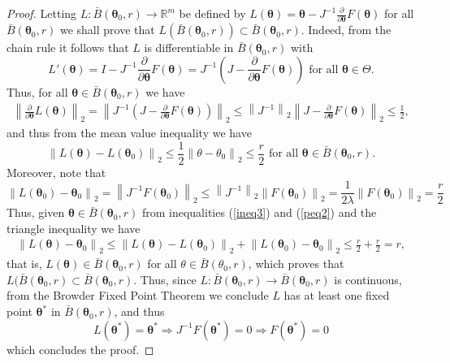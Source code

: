 \documentclass[10pt,a4paper,onecolumn]{article} %
\newcommand{\bs}{\boldsymbol}
\begin{document}
\begin{appendix}
\begin{proof}
Letting $L:\bar{B}(\bs{\theta}_0,r)\to \mathbb{R}^m$ be defined by
$L(\bs{\theta})=\bs{\theta}-J^{-1} \frac{\partial}{\partial \bs{\theta}} F(\bs{\theta})$ for all $\bar{B}(\bs{\theta}_0,r)$
we shall prove that $L(\bar{B}(\bs{\theta}_0,r))\subset \bar{B}(\bs{\theta}_0,r)$. Indeed, from the chain rule it follows that $L$ is differentiable in $\bar{B}(\bs{\theta}_0,r)$ with
\begin{equation*}
L'(\bs{\theta})=I-J^{-1} \frac{\partial}{\partial \bs{\theta}}F(\bs{\theta})=J^{-1}\left(J-\frac{\partial}{\partial \bs{\theta}} F(\bs{\theta})\right)\mbox{ for all }\bs{\theta}\in \Theta.
\end{equation*}
Thus, for all $\bs{\theta}\in \bar{B}(\bs{\theta}_0,r)$ we have
\begin{equation*}
\begin{aligned}
\label{peq1}
\left\|\frac{\partial}{\partial \bs{\theta}} L(\bs{\theta})\right\|_2=\left\|J^{-1}\left(J-\frac{\partial}{\partial \bs{\theta}} F(\bs{\theta})\right)\right\|_2\leq \left\|J^{-1}\right\|_2\left\|J-\frac{\partial}{\partial \bs{\theta}} F(\bs{\theta})\right\|_2\leq \frac{1}{2},
\end{aligned}
\end{equation*}
and thus from the mean value inequality we have
\begin{equation}\label{ineq3}
\left\|L(\bs{\theta})-L(\bs{\theta}_0)\right\|_2\leq \frac{1}{2} \left\|\theta-\theta_0\right\|_2\leq \frac{r}{2}\mbox{ for all }\bs{\theta}\in \bar{B}(\bs{\theta}_0,r).
\end{equation}
Moreover, note that
\begin{equation}\label{peq2}\left\|L(\bs{\theta}_0)-\bs{\theta}_0\right\|_2=\left\|J^{-1}F(\bs{\theta}_0)\right\|_2\leq \left\|J^{-1}\right\|_2\left\|F(\bs{\theta}_0)\right\|_2 =\frac{1}{2\lambda}\left\|F(\bs{\theta}_0)\right\|_2=\frac{r}{2}
\end{equation}
Thus, given $\bs{\theta}\in \bar{B}(\bs{\theta}_0,r)$ from inequalities (\ref{ineq3}) and  (\ref{peq2}) and the triangle inequality we have
\begin{equation*}
\begin{aligned}
\left\|L(\bs{\theta})-\bs{\theta}_0\right\|_2\leq \left\|L(\bs{\theta})-L(\bs{\theta}_0)\right\|_2+\left\|L(\bs{\theta}_0)-\bs{\theta}_0\right\|_2\leq \frac{r}{2}+\frac{r}{2}= r,
\end{aligned}
\end{equation*}
that is, $L(\bs{\theta})\in \bar{B}(\bs{\theta}_0,r)$ for all $\theta\in \bar{B}(\theta_0,r)$, which proves that $L(\bar{B}(\bs{\theta}_0,r)\subset \bar{B}(\bs{\theta}_0,r)$. Thus, since $L:\bar{B}(\bs{\theta}_0,r)\to \bar{B}( \bs{\theta}_0,r)$ is continuous, from the Browder Fixed Point Theorem we conclude $L$ has at least one fixed point $\bs{\theta}^*$ in $\bar{B}(\bs{\theta}_0,r)$, and thus
\begin{equation*}L(\bs{\theta}^*)=\bs{\theta}^*\Rightarrow J^{-1}F(\bs{\theta}^*)=0\Rightarrow F(\bs{\theta}^*)=0
\end{equation*}
which concludes the proof.
\end{proof}


\end{appendix}
\end{document}
